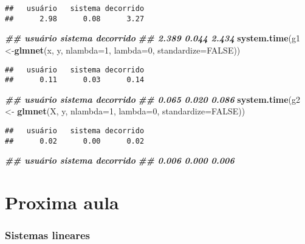 \documentclass[
]{article}
\newenvironment{Shaded}{\begin{snugshade}}{\end{snugshade}}
\newcommand{\AttributeTok}[1]{\textcolor[rgb]{0.13,0.29,0.53}{#1}}
\newcommand{\ConstantTok}[1]{\textcolor[rgb]{0.56,0.35,0.01}{#1}}
\newcommand{\DecValTok}[1]{\textcolor[rgb]{0.00,0.00,0.81}{#1}}
\newcommand{\DocumentationTok}[1]{\textcolor[rgb]{0.56,0.35,0.01}{\textbf{\textit{#1}}}}
\newcommand{\FunctionTok}[1]{\textcolor[rgb]{0.13,0.29,0.53}{\textbf{#1}}}
\newcommand{\NormalTok}[1]{#1}
\newcommand{\OtherTok}[1]{\textcolor[rgb]{0.56,0.35,0.01}{#1}}
\begin{document}
\begin{verbatim}
##   usuário   sistema decorrido 
##      2.98      0.08      3.27
\end{verbatim}

\begin{Shaded}
\begin{Highlighting}[]
\DocumentationTok{\#\# usuário sistema decorrido}
\DocumentationTok{\#\# 2.389 0.044 2.434}
\FunctionTok{system.time}\NormalTok{(g1 }\OtherTok{\textless{}{-}}\FunctionTok{glmnet}\NormalTok{(x, y, }\AttributeTok{nlambda=}\DecValTok{1}\NormalTok{, }\AttributeTok{lambda=}\DecValTok{0}\NormalTok{, }\AttributeTok{standardize=}\ConstantTok{FALSE}\NormalTok{))}
\end{Highlighting}
\end{Shaded}

\begin{verbatim}
##   usuário   sistema decorrido 
##      0.11      0.03      0.14
\end{verbatim}

\begin{Shaded}
\begin{Highlighting}[]
\DocumentationTok{\#\# usuário sistema decorrido}
\DocumentationTok{\#\# 0.065 0.020 0.086}
\FunctionTok{system.time}\NormalTok{(g2 }\OtherTok{\textless{}{-}} \FunctionTok{glmnet}\NormalTok{(X, y, }\AttributeTok{nlambda=}\DecValTok{1}\NormalTok{, }\AttributeTok{lambda=}\DecValTok{0}\NormalTok{, }\AttributeTok{standardize=}\ConstantTok{FALSE}\NormalTok{))}
\end{Highlighting}
\end{Shaded}

\begin{verbatim}
##   usuário   sistema decorrido 
##      0.02      0.00      0.02
\end{verbatim}

\begin{Shaded}
\begin{Highlighting}[]
\DocumentationTok{\#\# usuário sistema decorrido}
\DocumentationTok{\#\# 0.006 0.000 0.006}
\end{Highlighting}
\end{Shaded}

\hypertarget{proxima-aula}{%
\section{Proxima aula}\label{proxima-aula}}

\hypertarget{sistemas-lineares}{%
\subsubsection{Sistemas lineares}\label{sistemas-lineares}}
\end{document}
